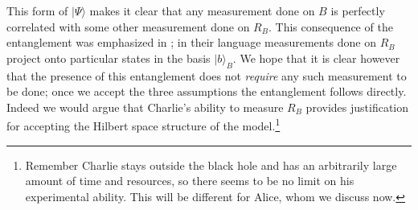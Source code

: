\documentclass[12pt]{article}
\newcommand{\ran}{\rangle}
\begin{document}
This form of $|\Psi\ran$ makes it clear that any measurement done on $B$ is perfectly correlated with some other measurement done on $R_B$.  This consequence of the entanglement was emphasized in \cite{Almheiri:2012rt}; in their language measurements done on $R_B$ project onto particular states in the basis $|b\ran_B$.  We hope that it is clear however that the presence of this entanglement does not \textit{require} any such measurement to be done; once we accept the three assumptions the entanglement follows directly.  Indeed we would argue that Charlie's ability to measure $R_B$ provides justification for accepting the Hilbert space structure of the model.\footnote{Remember Charlie stays outside the black hole and has an arbitrarily large amount of time and resources, so there seems to be no limit on his experimental ability.  This will be different for Alice, whom we discuss now.}
\end{document}
